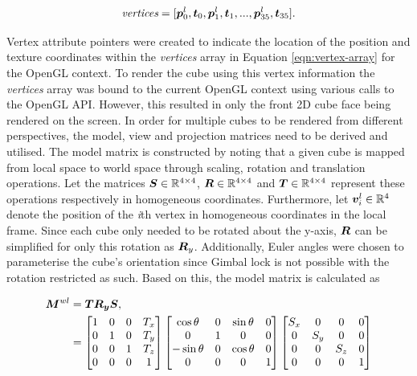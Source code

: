 \begin{equation}
	\textit{vertices}=[\bm{p}^l_0, \bm{t}_0, \bm{p}^l_1, \bm{t}_1,...,\bm{p}^l_{35}, \bm{t}_{35}].
	\label{eqn:vertex-array}
\end{equation}

Vertex attribute pointers were created to indicate the location of the position and texture coordinates within the \textit{vertices} array in Equation \ref{eqn:vertex-array} for the OpenGL context. To render the cube using this vertex information the \textit{vertices} array was bound to the current OpenGL context using various calls to the OpenGL API. However, this resulted in only the front 2D cube face being rendered on the screen. In order for multiple cubes to be rendered from different perspectives, the model, view and projection matrices need to be derived and utilised. The model matrix is constructed by noting that a given cube is mapped from local space to world space through scaling, rotation and translation operations. Let the matrices $\bm{S}\in\mathbb{R}^{4\times4}$, $\bm{R}\in\mathbb{R}^{4\times4}$ and $\bm{T}\in\mathbb{R}^{4\times4}$ represent these operations respectively in homogeneous coordinates. Furthermore, let $\bm{v}^l_i\in\mathbb{R}^4$ denote the position of the \textit{i}th vertex in homogeneous coordinates in the local frame. Since each cube only needed to be rotated about the y-axis, $\bm{R}$ can be simplified for only this rotation as $\bm{R}_y$. Additionally, Euler angles were chosen to parameterise the cube's orientation since Gimbal lock is not possible with the rotation restricted as such. Based on this, the model matrix is calculated as

\begin{align}
	\bm{M}^{wl}&=\bm{T}\bm{R_y}\bm{S},\\
	&=
	\begin{bmatrix}
		1 & 0 & 0 & T_x\\
		0 & 1 & 0 & T_y\\
		0 & 0 & 1 & T_z\\
		0 & 0 & 0 & 1
	\end{bmatrix}
	\begin{bmatrix}
		\cos\theta & 0 & \sin\theta & 0\\
		0 & 1 & 0 & 0\\
		-\sin\theta & 0 & \cos\theta & 0\\
		0 & 0 & 0 & 1
	\end{bmatrix}
	\begin{bmatrix}
		S_x & 0 & 0 & 0\\
		0 & S_y & 0 & 0\\
		0 & 0 & S_z & 0\\
		0 & 0 & 0 & 1
	\end{bmatrix}
\end{align}

